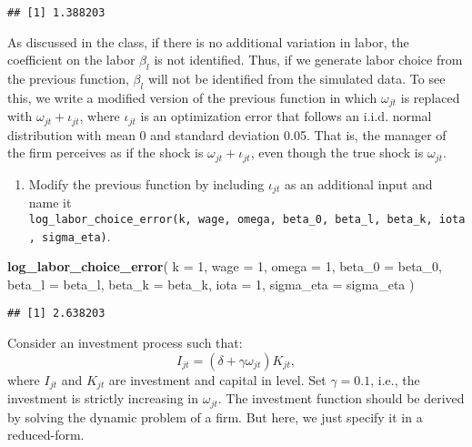 \documentclass[
]{book}
\newenvironment{Shaded}{\begin{snugshade}}{\end{snugshade}}
\newcommand{\AttributeTok}[1]{\textcolor[rgb]{0.13,0.29,0.53}{#1}}
\newcommand{\DecValTok}[1]{\textcolor[rgb]{0.00,0.00,0.81}{#1}}
\newcommand{\FunctionTok}[1]{\textcolor[rgb]{0.13,0.29,0.53}{\textbf{#1}}}
\newcommand{\NormalTok}[1]{#1}
\providecommand{\tightlist}{%
  \setlength{\itemsep}{0pt}\setlength{\parskip}{0pt}}
\begin{document}
\begin{verbatim}
## [1] 1.388203
\end{verbatim}

As discussed in the class, if there is no additional variation in labor, the coefficient on the labor \(\beta_l\) is not identified. Thus, if we generate labor choice from the previous function, \(\beta_l\) will not be identified from the simulated data. To see this, we write a modified version of the previous function in which \(\omega_{jt}\) is replaced with \(\omega_{jt} + \iota_{jt}\), where \(\iota_{jt}\) is an optimization error that follows an i.i.d. normal distribution with mean 0 and standard deviation 0.05. That is, the manager of the firm perceives as if the shock is \(\omega_{jt} + \iota_{jt}\), even though the true shock is \(\omega_{jt}\).

\begin{enumerate}
\def\labelenumi{\arabic{enumi}.}
\setcounter{enumi}{3}
\tightlist
\item
  Modify the previous function by including \(\iota_{jt}\) as an additional input and name it \texttt{log\_labor\_choice\_error(k,\ wage,\ omega,\ beta\_0,\ beta\_l,\ beta\_k,\ iota,\ sigma\_eta)}.
\end{enumerate}

\begin{Shaded}
\begin{Highlighting}[]
\FunctionTok{log\_labor\_choice\_error}\NormalTok{(}
  \AttributeTok{k =} \DecValTok{1}\NormalTok{, }
  \AttributeTok{wage =} \DecValTok{1}\NormalTok{, }
  \AttributeTok{omega =} \DecValTok{1}\NormalTok{, }
  \AttributeTok{beta\_0 =}\NormalTok{ beta\_0, }
  \AttributeTok{beta\_l =}\NormalTok{ beta\_l, }
  \AttributeTok{beta\_k =}\NormalTok{ beta\_k, }
  \AttributeTok{iota =} \DecValTok{1}\NormalTok{, }
  \AttributeTok{sigma\_eta =}\NormalTok{ sigma\_eta}
\NormalTok{  )}
\end{Highlighting}
\end{Shaded}

\begin{verbatim}
## [1] 2.638203
\end{verbatim}

Consider an investment process such that:
\[
I_{jt} = (\delta + \gamma \omega_{jt}) K_{jt},
\]
where \(I_{jt}\) and \(K_{jt}\) are investment and capital in level. Set \(\gamma = 0.1\), i.e., the investment is strictly increasing in \(\omega_{jt}\). The investment function should be derived by solving the dynamic problem of a firm. But here, we just specify it in a reduced-form.
\end{document}
